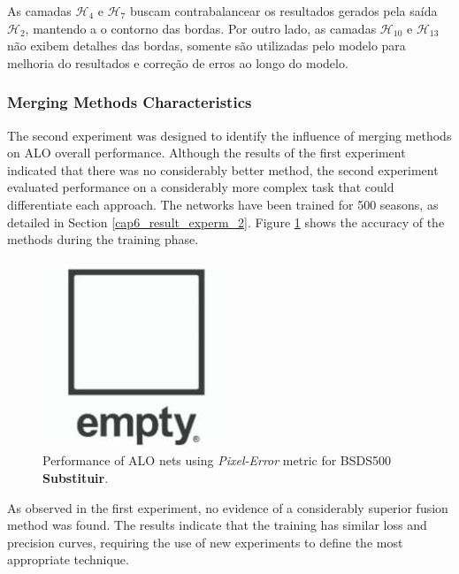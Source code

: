 As camadas $\mathcal{H}_{4}$ e $\mathcal{H}_{7}$ buscam contrabalancear os resultados gerados pela saída $\mathcal{H}_{2}$, mantendo a o contorno das bordas.
Por outro lado, as camadas $\mathcal{H}_{10}$ e $\mathcal{H}_{13}$ não exibem detalhes das bordas, somente são utilizadas pelo modelo para melhoria do resultados e correção de erros ao longo do modelo.


\subsubsection{\color{red}Merging Methods Characteristics}
\label{cap6_influencia_metodos_fusao}

The second experiment was designed to identify the influence of merging methods on \ac{ALO} overall performance.
Although the results of the first experiment indicated that there was no considerably better method, the second experiment evaluated performance on a considerably more complex task that could differentiate each approach.
The networks have been trained for 500 seasons, as detailed in Section \ref{cap6_result_experm_2}.
Figure \ref{fig:bsds_training} shows the accuracy of the methods during the training phase.

\begin{figure}[h!]
  \centering
  \includegraphics[width=0.5\textwidth]{imagens/ilustracoes/empty.png}
  \caption{Performance of ALO nets using \textit{Pixel-Error} metric for \ac{BSDS500} {\color{red}\textbf{Substituir}.}}
  \label{fig:bsds_training}
\end{figure}

As observed in the first experiment, no evidence of a considerably superior fusion method was found.
The results indicate that the training has similar loss and precision curves, requiring the use of new experiments to define the most appropriate technique.
